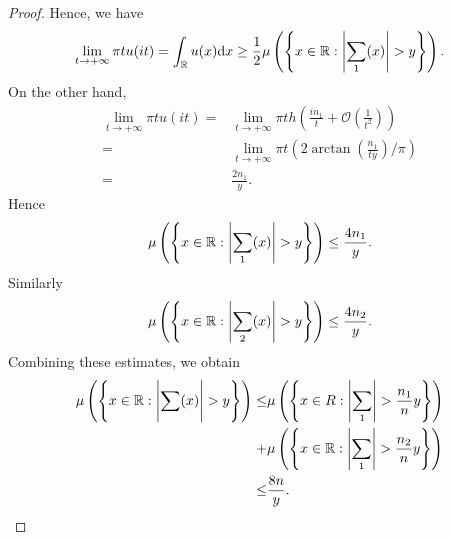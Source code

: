 \begin{proof}
Hence, we have 
\[
  \lim_{t\to +\infty}\pi tu(it)=\int_{\mathbb{R}}u(x)\mathrm{d}x\ge \frac{1}{2}\mu\left( \left\{ x\in \mathbb{R}:\left| \sum_{1}^{} (x) \right| >y \right\}  \right) .
\] 
On the other hand, 
\begin{equation*}
  \begin{aligned}
    \lim_{t\to +\infty}\pi t u(it) = & \lim_{t\to +\infty}\pi t h\left( \frac{i n_1}{t}+\mathcal{O}\left( \frac{1}{t^2} \right)  \right) \\
    = & \lim_{t\to +\infty}\pi t \left(2\arctan\left( \frac{n_1}{ty} \right) / \pi\right) \\
    = & \frac{2n_1}{y}.
  \end{aligned}
\end{equation*}
Hence 
\[
  \mu\left(\left\{ x\in \mathbb{R}: \left| \sum_{1}^{} (x) \right| >y \right\}\right) \le \frac{4n_1}{y}.
\] 
Similarly
\[
  \mu\left( \left\{ x\in \mathbb{R}: \left| \sum_{2}^{} (x) \right| >y \right\}  \right) \le \frac{4n_2}{y}.
\] 
Combining these estimates, we obtain 
\begin{equation*}
  \begin{aligned}
    \mu\left( \left\{ x\in \mathbb{R}:\left| \sum_{}^{} (x) \right| >  y \right\}  \right) \le & \mu\left( \left\{ x\in R:\left| \sum_1 \right| >\frac{n_1}{n}y \right\}  \right) \\
    + & \mu\left( \left\{ x\in \mathbb{R}:\left| \sum_1 \right| >\frac{n_2}{n}y \right\}  \right) \\
  \le &  \frac{8n}{y}.
\end{aligned}
\end{equation*}


\end{proof}

